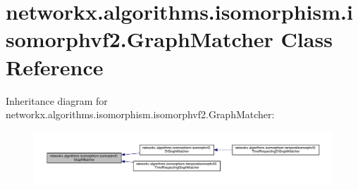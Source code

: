 \hypertarget{classnetworkx_1_1algorithms_1_1isomorphism_1_1isomorphvf2_1_1GraphMatcher}{}\section{networkx.\+algorithms.\+isomorphism.\+isomorphvf2.\+Graph\+Matcher Class Reference}
\label{classnetworkx_1_1algorithms_1_1isomorphism_1_1isomorphvf2_1_1GraphMatcher}


Inheritance diagram for networkx.\+algorithms.\+isomorphism.\+isomorphvf2.\+Graph\+Matcher\+:
\nopagebreak
\begin{figure}[H]
\begin{center}
\leavevmode
\includegraphics[width=350pt]{classnetworkx_1_1algorithms_1_1isomorphism_1_1isomorphvf2_1_1GraphMatcher__inherit__graph}
\end{center}
\end{figure}

